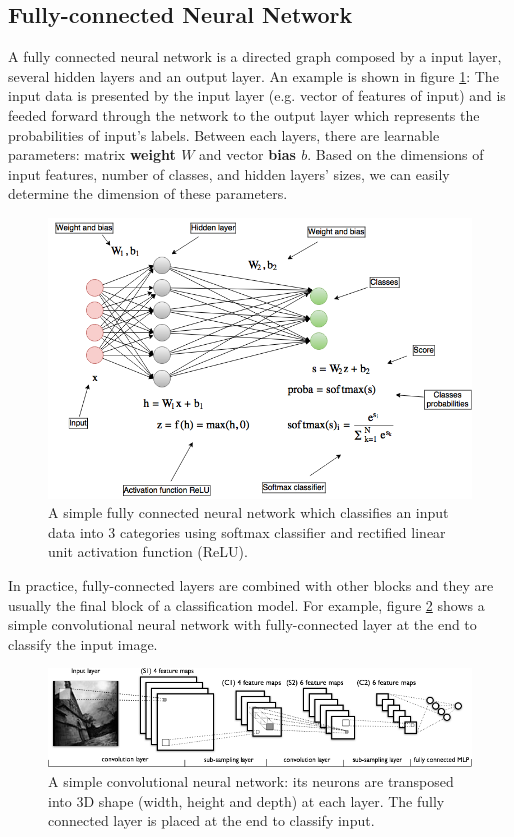 \subsection{Fully-connected Neural Network}
A fully connected neural network is a directed graph composed by a input layer, several hidden layers and an output layer. An example is shown in figure \ref{fig:fcNet}: The input data is presented by the input layer (e.g. vector of features of input) and is feeded forward through the network to the output layer which represents the probabilities of input's labels. Between each layers, there are learnable parameters: matrix \textbf{weight $W$} and vector \textbf{bias $b$}. Based on the dimensions of input features, number of classes, and hidden layers' sizes, we can easily determine the dimension of these parameters. 
\begin{figure}[tb]
	\centering
	\includegraphics[width=0.9\hsize]{./figures/fcNet}
	\caption{A simple fully connected neural network which classifies an input data into 3 categories using softmax classifier and rectified linear unit activation function (ReLU).}
	\label{fig:fcNet}
\end{figure}
In practice, fully-connected layers are combined with other blocks and they are usually the final block of a classification model. For example, figure \ref{fig:convNet1} shows a simple convolutional neural network with fully-connected layer at the end to classify the input image.
\begin{figure}[tb]
	\centering
	\includegraphics[width=0.9\hsize]{./figures/convNet1}
	\caption{A simple convolutional neural network: its neurons are transposed into 3D shape (width, height and depth) at each layer. The fully connected layer is placed at the end to classify input.}
	\label{fig:convNet1}
\end{figure}
